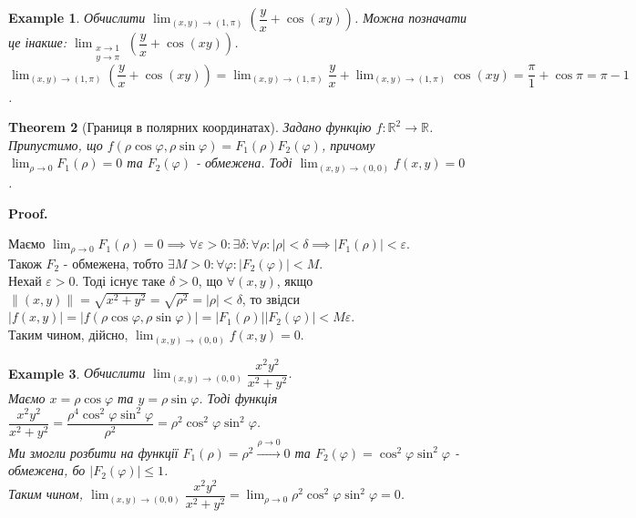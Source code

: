 \documentclass[a4paper, 10pt]{article}
\makeatletter
\def\huge{\displaystyle}
\def\qed{$\blacksquare$}
\theoremstyle{theoremdd}
\newtheorem{theorem}{Theorem}[subsection]
\theoremstyle{theoremdd}
\theoremstyle{theoremdd}
\theoremstyle{theoremdd}
\newtheorem{example}[theorem]{Example}
\theoremstyle{theoremdd}
\theoremstyle{theoremdd}
\theoremstyle{theoremdd}
\theoremstyle{theoremdd}
\renewenvironment{proof}[1][Proof.\\]{\par
\pushQED{\hfill \qed}%
\normalfont \topsep6\p@\@plus6\p@\relax
\trivlist
\item\relax
{\bfseries
#1\@addpunct{.}}\hspace\labelsep\ignorespaces
}{%
\popQED\endtrivlist\@endpefalse
}
\newcommand\Norm[1]{\lVert#1\rVert}
\makeatother
\begin{document}
\begin{example}
Обчислити $\huge\lim_{(x,y) \to (1,\pi)} \left( \dfrac{y}{x} + \cos (xy) \right)$. Можна позначати це інакше: $\huge\lim_{\substack{x \to 1 \\ y \to \pi}} \left( \dfrac{y}{x} + \cos (xy) \right)$.\\
$\huge\lim_{(x,y) \to (1,\pi)} \left( \dfrac{y}{x} + \cos (xy) \right) = \lim_{(x,y) \to (1,\pi)} \dfrac{y}{x} + \lim_{(x,y) \to (1,\pi)} \cos (xy) = \dfrac{\pi}{1} + \cos \pi = \pi - 1$.
\end{example}

\begin{theorem}[Границя в полярних координатах]
Задано функцію $f: \mathbb{R}^2 \to \mathbb{R}$. Припустимо, що $f(\rho \cos \varphi, \rho \sin \varphi) = F_1(\rho) F_2(\varphi)$, причому $\huge\lim_{\rho \to 0} F_1(\rho) = 0$ та $F_2(\varphi)$ - обмежена. Тоді $\huge\lim_{(x,y) \to (0,0)} f(x,y) = 0$.
\end{theorem}

\begin{proof}
Маємо $\huge\lim_{\rho \to 0} F_1(\rho) = 0 \implies \forall \varepsilon > 0: \exists \delta: \forall \rho: |\rho| < \delta \implies |F_1(\rho)| < \varepsilon$.\\
Також $F_2$ - обмежена, тобто $\exists M>0: \forall \varphi: |F_2(\varphi)| < M$.\\
Нехай $\varepsilon > 0$. Тоді існує таке $\delta > 0$, що $\forall (x,y)$, якщо $\Norm{(x,y)} = \sqrt{x^2+y^2} = \sqrt{\rho^2} = |\rho| < \delta$, то звідси $|f(x,y)| = |f(\rho \cos \varphi, \rho \sin \varphi)| = |F_1(\rho)| |F_2(\varphi)| < M\varepsilon$.\\
Таким чином, дійсно, $\huge\lim_{(x,y) \to (0,0)} f(x,y) = 0$.
\end{proof}

\begin{example}
Обчислити $\huge\lim_{(x,y) \to (0,0)} \dfrac{x^2y^2}{x^2+y^2}$.\\
Маємо $x = \rho \cos \varphi$ та $y = \rho \sin \varphi$. Тоді функція $\dfrac{x^2y^2}{x^2+y^2} = \dfrac{\rho^4 \cos^2 \varphi \sin^2 \varphi}{\rho^2} = \rho^2 \cos^2 \varphi \sin^2 \varphi$.\\
Ми змогли розбити на функції $F_1(\rho) = \rho^2 \overset{\rho \to 0}{\longrightarrow} 0$ та $F_2(\varphi) = \cos^2 \varphi \sin^2 \varphi$ - обмежена, бо $|F_2(\varphi)| \leq 1$.\\
Таким чином, $\huge\lim_{(x,y) \to (0,0)} \dfrac{x^2y^2}{x^2+y^2} = \lim_{\rho \to 0} \rho^2 \cos^2 \varphi \sin^2 \varphi = 0$.
\end{example}
\end{document}
